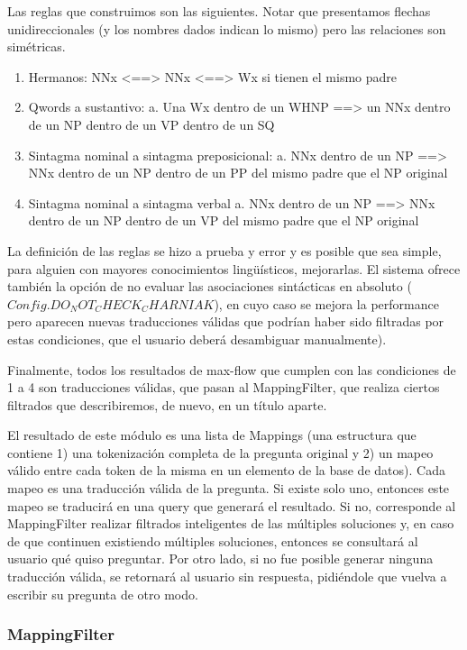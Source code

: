 Las reglas que construimos son las siguientes. Notar que presentamos flechas unidireccionales (y los nombres dados indican lo mismo) pero las relaciones son simétricas.

\begin{enumerate}
\item Hermanos: NNx <==> NNx <==> Wx si tienen el mismo padre
\item Qwords a sustantivo:
a.	Una Wx dentro de un WHNP ==> un NNx dentro de un NP dentro de un VP dentro de un SQ
\item Sintagma nominal a sintagma preposicional:
a.	NNx dentro de un NP ==> NNx dentro de un NP dentro de un PP del mismo padre que el NP original
\item Sintagma nominal a sintagma verbal
a.	NNx dentro de un NP ==> NNx dentro de un NP dentro de un VP del mismo padre que el NP original
\end{enumerate}

La definición de las reglas se hizo a prueba y error y es posible que sea simple, para alguien con mayores conocimientos lingüísticos, mejorarlas. El sistema ofrece también la opción de no evaluar las asociaciones sintácticas en absoluto ($Config.DO_NOT_CHECK_CHARNIAK$), en cuyo caso se mejora la performance pero aparecen nuevas traducciones válidas que podrían haber sido filtradas por estas condiciones, que el usuario deberá desambiguar manualmente).

Finalmente, todos los resultados de max-flow que cumplen con las condiciones de 1 a  4 son traducciones válidas, que pasan al MappingFilter, que realiza ciertos filtrados que describiremos, de nuevo, en un título aparte.

El resultado de este módulo es una lista de Mappings (una estructura que contiene 1) una tokenización completa de la pregunta original y 2) un mapeo válido entre cada token de la misma en un elemento de la base de datos). Cada mapeo es una traducción válida de la pregunta. Si existe solo uno, entonces este mapeo se traducirá en una query que generará el resultado. Si no, corresponde al MappingFilter realizar filtrados inteligentes de las múltiples soluciones y, en caso de que continuen existiendo múltiples soluciones, entonces se consultará al usuario qué quiso preguntar. Por otro lado, si no fue posible generar ninguna traducción válida, se retornará al usuario sin respuesta, pidiéndole que vuelva a escribir su pregunta de otro modo.


\subsubsection*{MappingFilter}
\label{subsubsec:mapping-filter}

